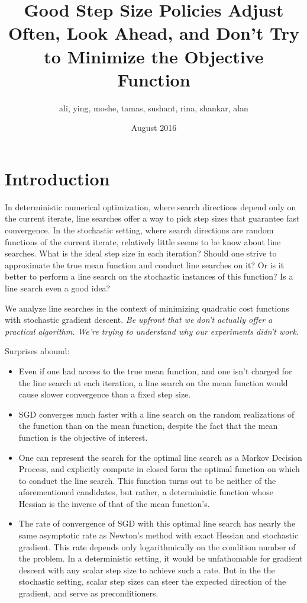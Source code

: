 \documentclass{article}
\title{Good Step Size Policies Adjust Often, Look Ahead, and Don't Try to Minimize the Objective Function}
\author{ali, ying, moshe, tamas, sushant, rina, shankar, alan}
\date{August 2016}
\begin{document}
\maketitle

\section{Introduction}

In deterministic numerical optimization, where search directions depend only on the current iterate, line searches offer a way to pick step sizes that guarantee fast convergence. In the stochastic setting, where search directions are random functions of the current iterate, relatively little seems to be know about line searches. What is the ideal step size in each iteration? Should one strive to approximate the true mean function and conduct line searches on it? Or is it better to perform a line search on the stochastic instances of this function? Is a line search even a good idea?

We analyze line searches in the context of minimizing quadratic cost functions with stochastic gradient descent. {\it Be upfront that we don't actually offer a practical algorithm. We're trying to understand why our experiments didn't work.} 

Surprises abound:
\begin{itemize}
    \item  Even if one had access to the true mean function, and one isn't charged for the line search at each iteration, a line search on the mean function would cause slower convergence than a fixed step size.
    \item SGD converges much faster with a line search on the random realizations of the function than on the mean function, despite the fact that the mean function is the objective of interest.
    \item One can represent the search for the optimal line search as a Markov Decision Process, and explicitly compute in closed form the optimal function on which to conduct the line search. This function turns out to be neither of the aforementioned candidates, but rather, a deterministic function whose Hessian is the inverse of that of the mean function's. 
    \item The rate of convergence of SGD with this optimal line search has nearly the same asymptotic rate  as Newton's method with exact Hessian and stochastic gradient. This rate depends only logarithmically on the condition number of the problem. In a deterministic setting, it would be unfathomable for gradient descent with any scalar step size to achieve such a rate. But in the the stochastic setting, scalar step sizes can steer the expected direction of the gradient, and serve as preconditioners.
\end{itemize}
\end{document}
